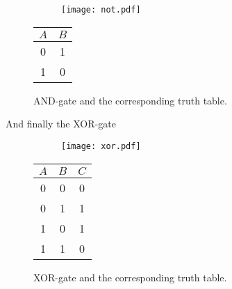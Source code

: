 \begin{figure}[H]
    \singlespacing
    \begin{subfigure}[]{0.45\textwidth}
        \flushright
        \texttt{[image: not.pdf]}
    \end{subfigure}
    \hfill
   \begin{subtable}[]{0.45\textwidth}
        \flushleft
        \begin{tabular}{cc}
            \toprule
            $A$ & $B$\\
            \midrule
            0 & 1\\
            1 & 0\\
            \bottomrule
        \end{tabular}
   \end{subtable}
   \caption{AND-gate and the corresponding truth table.}
\end{figure}
And finally the XOR-gate
\begin{figure}[H]
    \singlespacing
    \begin{subfigure}[]{0.45\textwidth}
        \flushright
        \texttt{[image: xor.pdf]}
    \end{subfigure}
    \hfill
   \begin{subtable}[]{0.45\textwidth}
        \flushleft
        \begin{tabular}{ccc}
            \toprule
            $A$ & $B$ & $C$\\
            \midrule
            0 & 0 & 0\\
            0 & 1 & 1\\
            1 & 0 & 1\\
            1 & 1 & 0\\
            \bottomrule
            
        \end{tabular}
   \end{subtable}
   \caption{XOR-gate and the corresponding truth table.}
\end{figure}